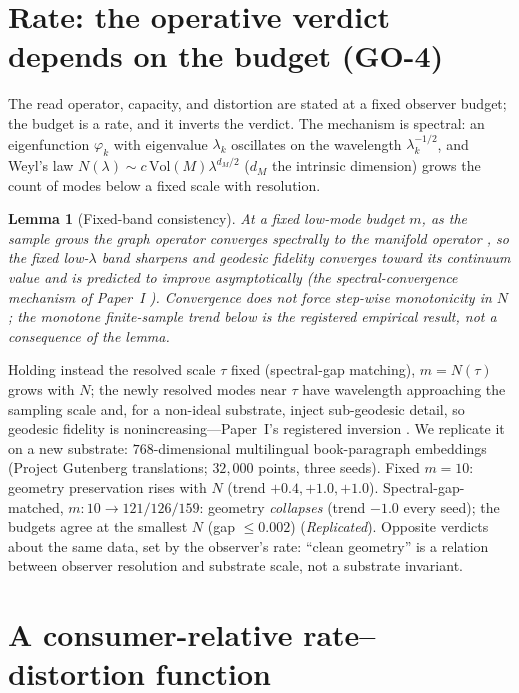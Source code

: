 \documentclass[lettersize,onecolumn]{IEEEtran}
\newtheorem{lemma}{Lemma}
\theoremstyle{definition}
\theoremstyle{remark}
\begin{document}
\section{Rate: the operative verdict depends on the budget (GO-4)}\label{sec:rate}

The read operator, capacity, and distortion are stated at a fixed observer budget;
the budget is a rate, and it inverts the verdict. The mechanism is spectral: an
eigenfunction $\varphi_k$ with eigenvalue $\lambda_k$ oscillates on the wavelength
$\lambda_k^{-1/2}$, and Weyl's law $N(\lambda)\sim c\,\mathrm{Vol}(M)\lambda^{d_M/2}$
($d_M$ the intrinsic dimension) grows the count of modes below a fixed scale with
resolution.

\begin{lemma}[Fixed-band consistency]\label{lem:band}
At a fixed low-mode budget $m$, as the sample grows the graph operator converges
spectrally to the manifold operator \cite{calder2022}, so the fixed low-$\lambda$
band sharpens and geodesic fidelity \emph{converges toward its continuum value} and is
predicted to improve asymptotically (the spectral-convergence mechanism of
Paper~I \cite{paper1}). Convergence does not force step-wise monotonicity in $N$; the
monotone finite-sample trend below is the \emph{registered empirical} result, not a
consequence of the lemma.
\end{lemma}

Holding instead the resolved scale $\tau$ fixed (spectral-gap matching), $m=N(\tau)$
grows with $N$; the newly resolved modes near $\tau$ have wavelength approaching the
sampling scale and, for a non-ideal substrate, inject sub-geodesic detail, so
geodesic fidelity is nonincreasing---Paper~I's registered inversion \cite{paper1}. We
replicate it on a new substrate: $768$-dimensional multilingual book-paragraph
embeddings (Project Gutenberg translations; $32{,}000$ points, three seeds). Fixed
$m=10$: geometry preservation rises with $N$ (trend $+0.4,+1.0,+1.0$).
Spectral-gap-matched, $m:10\to121/126/159$: geometry \emph{collapses} (trend $-1.0$
every seed); the budgets agree at the smallest $N$ (gap $\le0.002$)
(\emph{Replicated}). Opposite verdicts about the same data, set by the observer's
rate: ``clean geometry'' is a relation between observer resolution and substrate
scale, not a substrate invariant.

\section{A consumer-relative rate--distortion function}\label{sec:rd}
\end{document}
